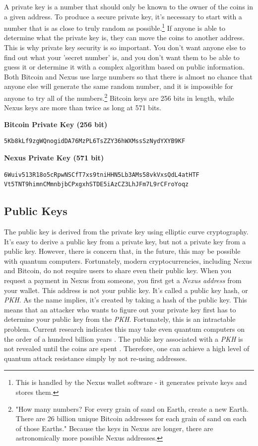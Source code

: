 \documentclass[11pt]{article}
\begin{document}
A private key is a number that should only be known to the owner of the coins in a given address.
To produce a secure private key, it's necessary to start with a number that is as close to truly random as possible.\footnote{This is handled by the Nexus wallet software - it generates private keys and stores them.}
If anyone is able to determine what the private key is, they can move the coins to another address.
This is why private key security is so important.
You don't want anyone else to find out what your 'secret number' is, 
and you don't want them to be able to guess it or determine it with a complex algorithm based on public information.
Both Bitcoin and Nexus use large numbers so that there is almost no chance that anyone else will generate the same random number, and it is impossible for anyone to try all of the numbers.\footnote{"How many numbers? For every grain of sand on Earth, create a new Earth. There are 26 billion unique Bitcoin addresses for each grain of sand on each of those Earths."\cite{weusesand} Because the keys in Nexus are longer, there are astronomically more possible Nexus addresses.}
Bitcoin keys are 256 bits in length, while Nexus keys are more than twice as long at 571 bits.

\bigskip
\textbf{Bitcoin Private Key (256 bit)}
\begin{lstlisting}
5Kb8kLf9zgWQnogidDA76MzPL6TsZZY36hWXMssSzNydYXYB9KF
\end{lstlisting}

\bigskip
\textbf{Nexus Private Key (571 bit)}
\begin{lstlisting}
6Wuiv513R18o5cRpwNSCfT7xs9tniHHN5Lb3AMs58vkVxsQdL4atHTF
Vt5TNT9himnCMmnbjbCPxgxhSTDE5iAzCZ3LhJFm7L9rCFroYoqz
\end{lstlisting}

\subsection{Public Keys}

The public key is derived from the private key using elliptic curve cryptography.
It's easy to derive a public key from a private key, but not a private key from a public key.
However, there is concern that, in the future, this may be possible with quantum computers.
Fortunately, modern cryptocurrencies, including Nexus and Bitcoin, do not require users to share even their public key.
When you request a payment in Nexus from someone, you first get a \textit{Nexus address} from your wallet.
This address is not your public key.
It's called a public key hash, or \textit{PKH}.
As the name implies, it's created by taking a hash of the public key.
This means that an attacker who wants to figure out your private key first has to determine your public key from the \textit{PKH}.
Fortunately, this is an intractable problem. Current research indicates this may take even quantum computers on the order of a hundred billion years \cite{registersha3,cryptosha3}.
The public key associated with a \textit{PKH} is not revealed until the coins are spent \cite{bitcorepkh}.
Therefore, one can achieve a high level of quantum attack resistance simply by not re-using addresses.\\
\end{document}
